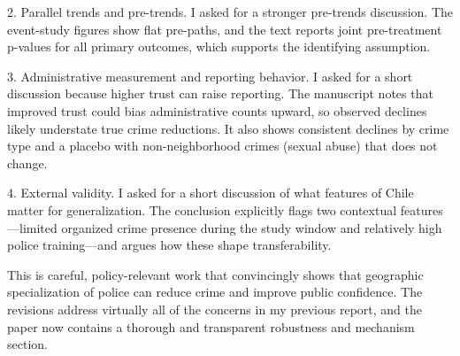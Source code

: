 \begin{refcomment}
2.	Parallel trends and pre-trends. I asked for a stronger pre-trends discussion. The event-study figures show flat pre-paths, and the text reports joint pre-treatment p-values for all primary outcomes, which supports the identifying assumption.

3.	Administrative measurement and reporting behavior. I asked for a short discussion because higher trust can raise reporting. The manuscript notes that improved trust could bias administrative counts upward, so observed declines likely understate true crime reductions. It also shows consistent declines by crime type and a placebo with non-neighborhood crimes (sexual abuse) that does not change.

4.	External validity. I asked for a short discussion of what features of Chile matter for generalization. The conclusion explicitly flags two contextual features—limited organized crime presence during the study window and relatively high police training—and argues how these shape transferability.

This is careful, policy-relevant work that convincingly shows that geographic specialization of police can reduce crime and improve public confidence. The revisions address virtually all of the concerns in my previous report, and the paper now contains a thorough and transparent robustness and mechanism section.

\label{pt:r3_01}
\end{refcomment}


\begin{response}
    
\end{response}
